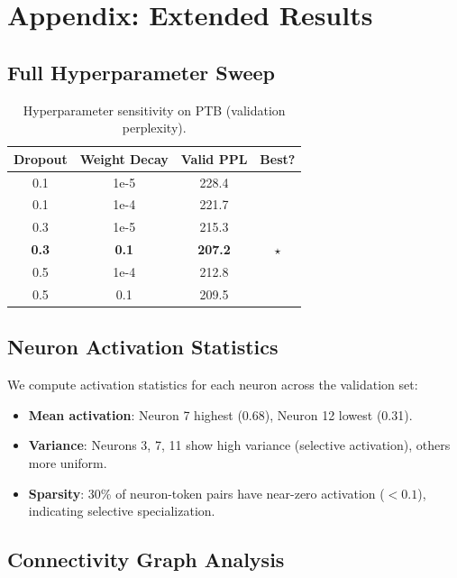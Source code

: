 \documentclass{article}
\begin{document}
\newpage
\appendix

\section{Appendix: Extended Results}

\subsection{Full Hyperparameter Sweep}

\begin{table}[h]
\centering
\caption{Hyperparameter sensitivity on PTB (validation perplexity).}
\begin{tabular}{cccc}
\toprule
\textbf{Dropout} & \textbf{Weight Decay} & \textbf{Valid PPL} & \textbf{Best?} \\
\midrule
0.1 & 1e-5 & 228.4 & \\
0.1 & 1e-4 & 221.7 & \\
0.3 & 1e-5 & 215.3 & \\
\textbf{0.3} & \textbf{0.1} & \textbf{207.2} & $\star$ \\
0.5 & 1e-4 & 212.8 & \\
0.5 & 0.1 & 209.5 & \\
\bottomrule
\end{tabular}
\end{table}

\subsection{Neuron Activation Statistics}

We compute activation statistics for each neuron across the validation set:
\begin{itemize}
    \item \textbf{Mean activation}: Neuron 7 highest (0.68), Neuron 12 lowest (0.31).
    \item \textbf{Variance}: Neurons 3, 7, 11 show high variance (selective activation), others more uniform.
    \item \textbf{Sparsity}: 30\% of neuron-token pairs have near-zero activation ($<0.1$), indicating selective specialization.
\end{itemize}

\subsection{Connectivity Graph Analysis}
\end{document}
